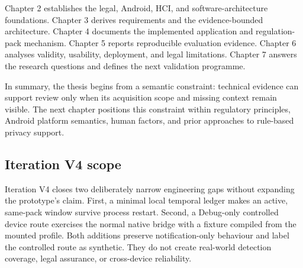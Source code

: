 Chapter 2 establishes the legal, Android, HCI, and software-architecture foundations. Chapter 3 derives requirements and the evidence-bounded architecture. Chapter 4 documents the implemented application and regulation-pack mechanism. Chapter 5 reports reproducible evaluation evidence. Chapter 6 analyses validity, usability, deployment, and legal limitations. Chapter 7 answers the research questions and defines the next validation programme.

In summary, the thesis begins from a semantic constraint: technical evidence can support review only when its acquisition scope and missing context remain visible. The next chapter positions this constraint within regulatory principles, Android platform semantics, human factors, and prior approaches to rule-based privacy support.

\subsection{Iteration V4 scope}

Iteration V4 closes two deliberately narrow engineering gaps without expanding the prototype's claim. First, a minimal local temporal ledger makes an active, same-pack window survive process restart. Second, a Debug-only controlled device route exercises the normal native bridge with a fixture compiled from the mounted profile. Both additions preserve notification-only behaviour and label the controlled route as synthetic. They do not create real-world detection coverage, legal assurance, or cross-device reliability.
